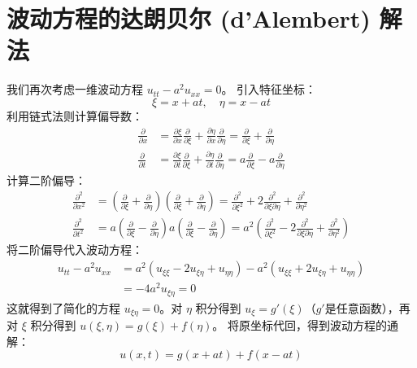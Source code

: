 \documentclass{article}
\begin{document}
	\section{波动方程的达朗贝尔 (d'Alembert) 解法}
	
	我们再次考虑一维波动方程 $u_{tt} - a^2 u_{xx} = 0$。
	引入特征坐标：
	$$ \xi = x + at, \quad \eta = x - at $$
	利用链式法则计算偏导数：
	\begin{align*}
		\frac{\partial}{\partial x} &= \frac{\partial \xi}{\partial x}\frac{\partial}{\partial \xi} + \frac{\partial \eta}{\partial x}\frac{\partial}{\partial \eta} = \frac{\partial}{\partial \xi} + \frac{\partial}{\partial \eta} \\
		\frac{\partial}{\partial t} &= \frac{\partial \xi}{\partial t}\frac{\partial}{\partial \xi} + \frac{\partial \eta}{\partial t}\frac{\partial}{\partial \eta} = a\frac{\partial}{\partial \xi} - a\frac{\partial}{\partial \eta}
	\end{align*}
	计算二阶偏导：
	\begin{align*}
		\frac{\partial^2}{\partial x^2} &= \left(\frac{\partial}{\partial \xi} + \frac{\partial}{\partial \eta}\right)\left(\frac{\partial}{\partial \xi} + \frac{\partial}{\partial \eta}\right) = \frac{\partial^2}{\partial \xi^2} + 2\frac{\partial^2}{\partial \xi \partial \eta} + \frac{\partial^2}{\partial \eta^2} \\
		\frac{\partial^2}{\partial t^2} &= a\left(\frac{\partial}{\partial \xi} - \frac{\partial}{\partial \eta}\right)a\left(\frac{\partial}{\partial \xi} - \frac{\partial}{\partial \eta}\right) = a^2\left(\frac{\partial^2}{\partial \xi^2} - 2\frac{\partial^2}{\partial \xi \partial \eta} + \frac{\partial^2}{\partial \eta^2}\right)
	\end{align*}
	将二阶偏导代入波动方程：
	\begin{align*}
		u_{tt} - a^2 u_{xx} &= a^2(u_{\xi\xi} - 2u_{\xi\eta} + u_{\eta\eta}) - a^2(u_{\xi\xi} + 2u_{\xi\eta} + u_{\eta\eta}) \\
		&= -4a^2 u_{\xi\eta} = 0
	\end{align*}
	这就得到了简化的方程 $u_{\xi\eta} = 0$。对 $\eta$ 积分得到 $u_{\xi} = g'(\xi)$（$g'$是任意函数），再对 $\xi$ 积分得到 $u(\xi, \eta) = g(\xi) + f(\eta)$。
	将原坐标代回，得到波动方程的通解：
	$$ u(x,t) = g(x+at) + f(x-at) $$
	
\end{document}
